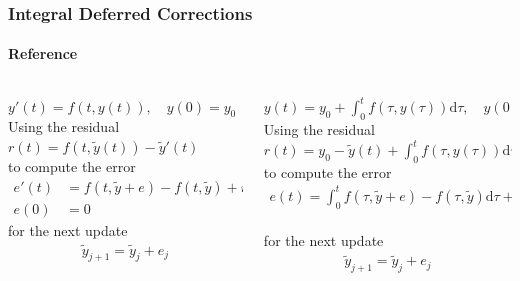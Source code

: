 \documentclass[%
  english,
  hyperref={pdfpagelabels=false},
  aspectratio=1610]{beamer}
\begin{document}
\begin{frame}
  \frametitle{Integral Deferred Corrections}
  \framesubtitle{Reference}
  \begin{columns}[T]
    \begin{column}{7cm}
      $ y'(t) = f\left( t, y\left( t \right) \right),\quad y\left( 0 \right)= y_{0} $\\[1.5em]
    Using the residual
\\[1em]
	$r(t) = f\left( t, \tilde y\left( t \right) \right) - \tilde y'\left( t \right)$
\\[1em]
    to compute the error
    \begin{align*}
	e'(t) &= f(t,\tilde y + e) - f\left( t, \tilde y \right) + r'\left( t \right)\\
	e(0)  &= 0
    \end{align*}
    for the next update
    \begin{align*}
      \tilde y_{j+1} = \tilde y_{j} + e_{j}
    \end{align*}
    

    \end{column}
    \begin{column}{7cm} 
      $   y(t) = y_0 + \int_{0}^{t}  f\left( \tau, y\left( \tau \right) \right) \mathrm{d}\tau, \quad y\left( 0 \right)= y_{0} $ \\[1.5em]
      Using the residual\\[1em]
      $r(t) = y_{0} - \tilde y\left( t \right) + \int_{0}^{t} f\left(\tau, y\left( \tau \right) \right)  \mathrm{d}\tau $\\[1em]
    to compute the error
    \begin{align*}
      e(t) = \int_{0}^{t}f(\tau,\tilde y + e) - f\left( \tau, \tilde y \right) \mathrm{d}\tau + r\left( t \right)
    \end{align*}\\[0.5em]
    for the next update
    \begin{align*}
      \tilde y_{j+1} = \tilde y_{j} + e_{j}
    \end{align*}


  \end{column}
\end{columns}


\end{frame}
\end{document}
